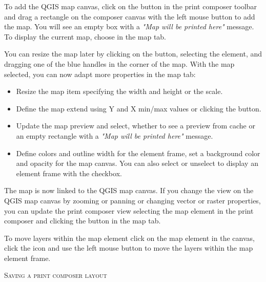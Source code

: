 To add the QGIS map canvas, click on the  button in the print composer toolbar and drag a 
rectangle on the composer canvas with the left mouse button to add the map. 
You will see an empty box with a \textit{"Map will be printed here"} message.
To display the current map, choose  in the map  tab.

You can resize the map later by clicking on the  button, selecting the element, and dragging one of the blue handles in the corner of the map. With the 
map selected, you can now adapt more properties in the map  tab:

\begin{itemize}
\item Resize the map item specifying the width and height or the scale.
\item Define the map extend using Y and X min/max values or clicking the 
 button.
\item Update the map preview and select, whether to see a preview from cache 
or an empty rectangle with a \textit{"Map will be printed here"} message. 
\item Define colors and outline width for the element frame, set a background color and opacity for the map canvas. You can also select or unselect to display an element frame with the  checkbox.
\end{itemize}


The map is now linked to the QGIS map canvas. If you change the view on the 
QGIS map canvas by zooming or panning or changing vector or raster properties, 
you can update the print composer view selecting the map element in the print composer and clicking the  button in the map 
 tab.

To move layers within the map element click on the map element in the 
canvas, click the  icon 
and use the left mouse button to move the layers within the map element frame.

\begin{Tip}\caption{\textsc{Saving a print composer layout}}
\end{Tip} 


